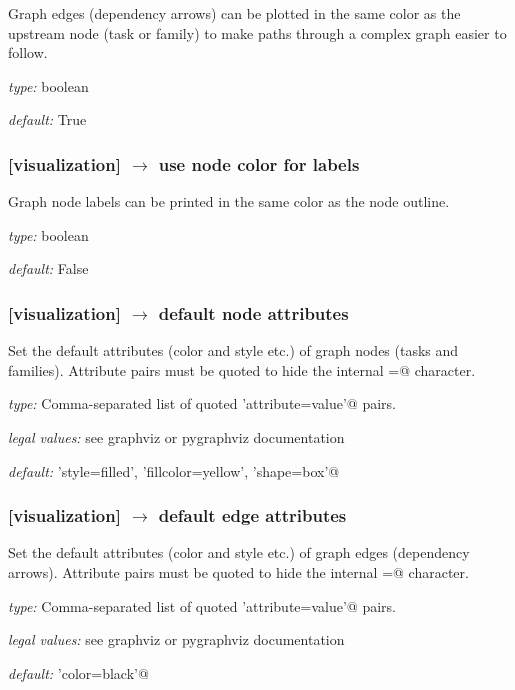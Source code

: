 Graph edges (dependency arrows) can be plotted in the same color
as the upstream node (task or family) to make paths through a complex
graph easier to follow.

\begin{myitemize}
    \item {\em type:} boolean
    \item {\em default:} True
\end{myitemize}

\subsubsection[use node color for labels]{[visualization] $\rightarrow$ use node color for labels}

Graph node labels can be printed in the same color as the node outline.

\begin{myitemize}
    \item {\em type:} boolean
    \item {\em default:} False
\end{myitemize}


\subsubsection[default node attributes]{[visualization] $\rightarrow$ default node attributes}

Set the default attributes (color and style etc.) of graph nodes (tasks and families).
Attribute pairs must be quoted to hide the internal \lstinline@=@ character.

\begin{myitemize}
    \item {\em type:} Comma-separated list of quoted \lstinline@'attribute=value'@ pairs.
    \item {\em legal values:} see graphviz or pygraphviz documentation
    \item {\em default:} \lstinline@'style=filled', 'fillcolor=yellow', 'shape=box'@
\end{myitemize}

\subsubsection[default edge attributes]{[visualization] $\rightarrow$ default edge attributes}

Set the default attributes (color and style etc.) of graph edges
(dependency arrows).  Attribute pairs must be quoted to hide the
internal \lstinline@=@ character.
\begin{myitemize}
    \item {\em type:} Comma-separated list of quoted \lstinline@'attribute=value'@ pairs.
    \item {\em legal values:} see graphviz or pygraphviz documentation
    \item {\em default:} \lstinline@'color=black'@
\end{myitemize}

